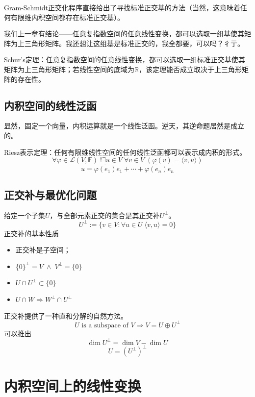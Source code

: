 \documentclass{tufte-book}
\begin{document}
\par Gram-Schmidt正交化程序直接给出了寻找标准正交基的方法（当然，这意味着\textcolor{BrickRed}{任何有限维内积空间都存在标准正交基}）。
\par 我们上一章有结论——任意复指数空间的任意线性变换，都可以选取一组基使其矩阵为上三角形矩阵。我还想让这组基是标准正交的，我全都要，可以吗？彳亍。
\par \textcolor{BrickRed}{Schur's定理：任意复指数空间的任意线性变换，都可以选取一组标准正交基使其矩阵为上三角形矩阵；若线性空间的底域为\(\mathbb{R}\)，该定理能否成立取决于上三角形矩阵的存在性。}
\section{内积空间的线性泛函}
\par 显然，固定一个向量，内积运算就是一个线性泛函。逆天，其逆命题居然是成立的。\par \textcolor{BrickRed}{Riesz表示定理：任何有限维线性空间的任何线性泛函都可以表示成内积的形式。}
\[\forall \varphi \in \mathcal{L}(V,\mathbb{F})\;!\exists u\in V\; \forall v\in V\;(\varphi(v) = \langle v,u\rangle)\]
\[u = \overline{\varphi(e_1)}e_1 + \cdots + \overline{\varphi(e_n)}e_n\]
\section{正交补与最优化问题}
\par 给定一个子集\(U\)，与全部元素正交的集合是其正交补\(U^\perp\)。
\[U^\perp := \{v\in V : \forall u \in U\; \langle v,u\rangle = 0 \}\]
正交补的基本性质
\begin{itemize}
    \item 正交补是子空间；
    \item \(\{0\}^\perp = V\;\wedge\;V^\perp = \{0\}\)
    \item \(U \cap U^\perp \subset \{0\}\)
    \item \(U \cap W \Rightarrow  W^\perp \cap U^\perp\)
\end{itemize}
\par 正交补提供了一种直和分解的自然方法。
\[U\text{ is a subspace of }V \Rightarrow V = U \oplus U^\perp\]
\newpage
可以推出
\[\dim U^\perp = \dim V -\dim U\]
\[U=(U^\perp)^\perp\]

\chapter{内积空间上的线性变换}
\end{document}
